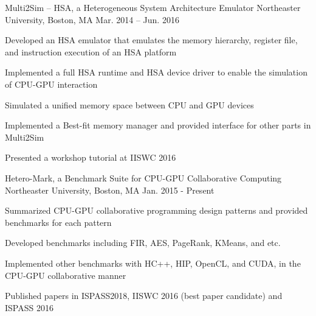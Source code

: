 \begin{cventries}
  \cventry
    {}
    {Multi2Sim – HSA, a Heterogeneous System Architecture Emulator}
    {Northeaster University, Boston, MA}
    {Mar. 2014 – Jun. 2016}
    {
      \begin{cvitems}
        \item {Developed an HSA emulator that emulates the memory hierarchy, register file, and instruction execution of an HSA platform}
        \item {Implemented a full HSA runtime and HSA device driver to enable the simulation of CPU-GPU interaction}
        \item {Simulated a unified memory space between CPU and GPU devices}
        \item {Implemented a Best-fit memory manager and provided interface for other parts in Multi2Sim}
        \item {Presented a workshop tutorial at IISWC 2016}
      \end{cvitems}
    }
  
  \cventry
    {}
    {Hetero-Mark, a Benchmark Suite for CPU-GPU Collaborative Computing}
    {Northeaster University, Boston, MA}
    {Jan. 2015 - Present}
    {
      \begin{cvitems}
        \item {Summarized CPU-GPU collaborative programming design patterns and provided benchmarks for each pattern}
        \item {Developed benchmarks including FIR, AES, PageRank, KMeans, and etc.}
        \item {Implemented other benchmarks with HC++, HIP, OpenCL, and CUDA, in the CPU-GPU collaborative manner}
        \item {Published papers in ISPASS2018, IISWC 2016 (best paper candidate) and ISPASS 2016}
      \end{cvitems}
    }
\end{cventries}
